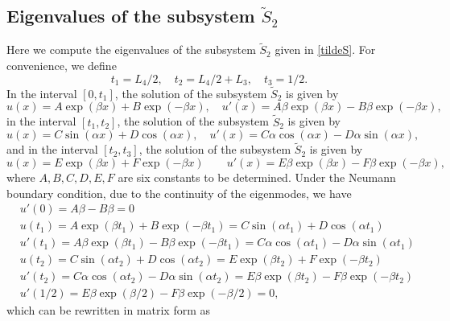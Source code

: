 \documentclass[a4paper,11pt]{article}
\begin{document}
\begin{appendices}
\subsection{Eigenvalues of the subsystem $\tilde{S}_2$}
Here we compute the eigenvalues of the subsystem $\tilde{S}_2$ given in \eqref{tildeS}. For convenience, we define
\begin{equation*}
t_1 = L_4/2, \quad t_2 = L_4/2 + L_3, \quad t_3 = 1/2.
\end{equation*}
In the interval $[0, t_1]$, the solution of the subsystem $\tilde{S}_2$ is given by
\begin{equation*}
u(x) = A \exp(\beta x) + B \exp(-\beta x), \quad u'(x) = A \beta \exp(\beta x) - B \beta \exp(-\beta x),
\end{equation*}
in the interval $[t_1, t_2]$, the solution of the subsystem $\tilde{S}_2$ is given by
\begin{equation*}
u(x) = C \sin(\alpha x) + D \cos(\alpha x), \quad u'(x) = C \alpha \cos(\alpha x) - D \alpha \sin(\alpha x),
\end{equation*}
and in the interval $[t_2, t_3]$,  the solution of the subsystem $\tilde{S}_2$ is given by
\begin{equation*}
u(x) = E \exp(\beta x) + F \exp(-\beta x) \qquad u'(x) = E \beta \exp(\beta x) - F \beta \exp(-\beta x),
\end{equation*}
where $A ,B, C, D, E, F$ are six constants to be determined. Under the Neumann boundary condition, due to the continuity of the eigenmodes, we have
\begin{equation*}
\begin{split}
&u'(0) = A \beta - B \beta = 0 \\
&u(t_1) = A \exp(\beta t_1) + B \exp(-\beta t_1) = C \sin(\alpha t_1) + D \cos(\alpha t_1) \\
&u'(t_1) = A \beta \exp(\beta t_1) - B \beta \exp(-\beta t_1) = C \alpha \cos(\alpha t_1) - D \alpha \sin(\alpha t_1) \\
&u(t_2) = C \sin(\alpha t_2) + D \cos(\alpha t_2) = E \exp(\beta t_2) + F \exp(-\beta t_2) \\
&u'(t_2) = C \alpha \cos(\alpha t_2) - D \alpha \sin(\alpha t_2) = E \beta \exp(\beta t_2) - F \beta \exp(-\beta t_2) \\
&u'(1/2) = E \beta \exp(\beta/2) - F \beta \exp(-\beta/2) = 0,
\end{split}
\end{equation*}
which can be rewritten in matrix form as
\begin{equation*}

\end{equation*}
\end{appendices}
\end{document}
